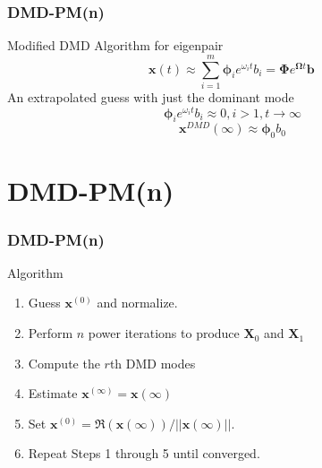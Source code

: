 \documentclass[fleqn]{beamer}
\renewcommand{\vec}[1]{\bm{#1}} %
\begin{document}
\begin{frame}
\frametitle{DMD-PM(n)}
\begin{block}{Modified DMD Algorithm for eigenpair}
\vspace*{-\baselineskip}\setlength\belowdisplayshortskip{0pt}
\begin{equation*}
\label{eq:full_prediction}
\mathbf{x}(t) \approx \sum^{m}_{i=1} \mathbf{\phi}_i e^{\omega_i t} b_i = \boldsymbol{\Phi} e^{\bm{\Omega}t} \mathbf{b} \, 
\end{equation*}
An extrapolated guess with just the dominant mode \footnotemark
\begin{equation*}
\mathbf{\phi}_i e^{\omega_i t} b_i \approx 0 , i  > 1, t \rightarrow \infty
\end{equation*}
\begin{equation*}
\label{eq:f_mode}
\vec{x}^{DMD}(\infty) \approx \vec{\phi}_0 b_0 
\end{equation*}
\end{block}
\end{frame} 

\section{DMD-PM(n)}
\begin{frame}
\frametitle{DMD-PM(n)}
\begin{block}{Algorithm}
\begin{enumerate}
 \item Guess $\mathbf{x}^{(0)}$ and normalize.
 \item Perform $n$ power iterations to produce $\mathbf{X}_0$ and $\mathbf{X}_1$
 \item Compute the $r$th DMD modes 
 \item Estimate $\mathbf{x}^{(\infty)}=\mathbf{x}(\infty)$
 \item Set $\mathbf{x}^{(0)} = \Re(\mathbf{x}(\infty)) / ||\mathbf{x}(\infty)||$.  
 \item Repeat Steps 1 through 5 until converged.
\end{enumerate}
\end{block}
\end{frame}  
\end{document}
